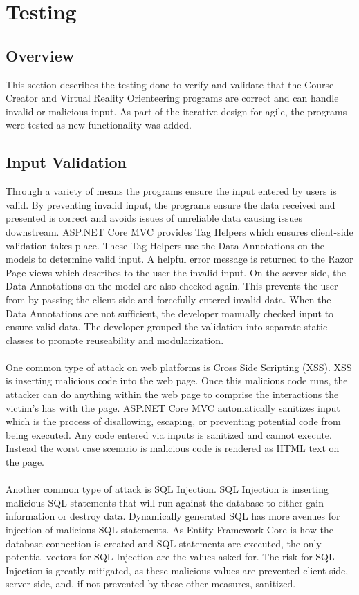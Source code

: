\section{Testing}																	
\label{sec:Testing}

\subsection{Overview} 
This section describes the testing done to verify and validate that the Course Creator and Virtual Reality Orienteering programs are correct and can handle invalid or malicious input. As part of the iterative design for agile, the programs were tested as new functionality was added. 

\subsection{Input Validation}
Through a variety of means the programs ensure the input entered by users is valid. By preventing invalid input, the programs ensure the data received and presented is correct and avoids issues of unreliable data causing issues downstream. ASP.NET Core MVC provides Tag Helpers which ensures client-side validation takes place. These Tag Helpers use the Data Annotations on the models to determine valid input. A helpful error message is returned to the Razor Page views which describes to the user the invalid input. On the server-side, the Data Annotations on the model are also checked again. This prevents the user from by-passing the client-side and forcefully entered invalid data. When the Data Annotations are not sufficient, the developer manually checked input to ensure valid data. The developer grouped the validation into separate static classes to promote reuseability and modularization. \\
\\
One common type of attack on web platforms is Cross Side Scripting (XSS). XSS is inserting malicious code into the web page. Once this malicious code runs, the attacker can do anything within the web page to comprise the interactions the victim's has with the page. ASP.NET Core MVC automatically sanitizes input which is the process of disallowing, escaping, or preventing potential code from being executed. Any code entered via inputs is sanitized and cannot execute. Instead the worst case scenario is malicious code is rendered as HTML text on the page.\\
\\
Another common type of attack is SQL Injection. SQL Injection is inserting malicious SQL statements that will run against the database to either gain information or destroy data. Dynamically generated SQL has more avenues for injection of malicious SQL statements. As Entity Framework Core is how the database connection is created and SQL statements are executed, the only potential vectors for SQL Injection are the values asked for. The risk for SQL Injection is greatly mitigated, as these malicious values are prevented client-side, server-side, and, if not prevented by these other measures, sanitized. 
